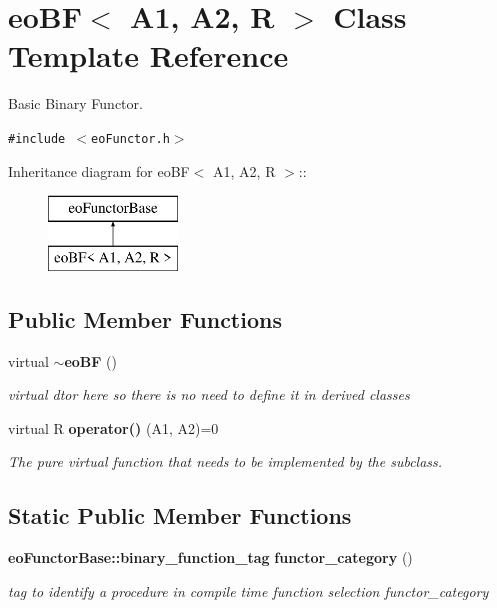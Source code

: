 \section{eo\-BF$<$ A1, A2, R $>$ Class Template Reference}
\label{classeo_b_f}
Basic Binary Functor.  


{\tt \#include $<$eo\-Functor.h$>$}

Inheritance diagram for eo\-BF$<$ A1, A2, R $>$::\begin{figure}[H]
\begin{center}
\leavevmode
\includegraphics[height=2cm]{classeo_b_f}
\end{center}
\end{figure}
\subsection*{Public Member Functions}
\begin{CompactItemize}
\item 
virtual {\bf $\sim$eo\-BF} ()\label{classeo_b_f_a0}

\begin{CompactList}\small\item\em virtual dtor here so there is no need to define it in derived classes \item\end{CompactList}\item 
virtual R {\bf operator()} (A1, A2)=0\label{classeo_b_f_a1}

\begin{CompactList}\small\item\em The pure virtual function that needs to be implemented by the subclass. \item\end{CompactList}\end{CompactItemize}
\subsection*{Static Public Member Functions}
\begin{CompactItemize}
\item 
{\bf eo\-Functor\-Base::binary\_\-function\_\-tag} {\bf functor\_\-category} ()\label{classeo_b_f_e0}

\begin{CompactList}\small\item\em tag to identify a procedure in compile time function selection functor\_\-category \item\end{CompactList}\end{CompactItemize}


